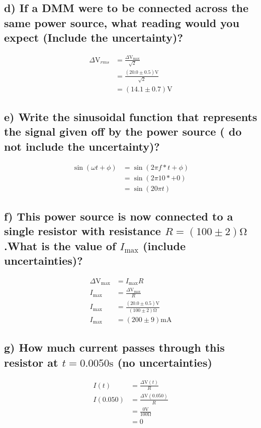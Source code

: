 \documentclass{report}
\begin{document}
\subsection*{d) If a DMM were to be connected across the same power source, what reading would you expect (Include the uncertainty)?}
    \begin{align}
    \Delta\si{\volt}_{rms}&=\frac{\Delta\si{\volt}_{\max}}{\sqrt{2}} \nonumber\\
                          &=\frac{(20.0\pm0.5)\si{\volt}}{\sqrt{2}}\nonumber\\
                          &=(14.1\pm0.7)\si{\volt}
    \end{align}

\subsection*{e) Write the sinusoidal function that represents the signal given off by the power source ( do not include the uncertainty)?}
    \begin{align}
        \sin(\omega t + \phi)&=\sin(2\pi f*t + \phi)\nonumber\\
        &=\sin(2\pi 10* + 0)\nonumber\\
        &=\sin(20\pi t)
    \end{align}

\subsection*{f) This power source is now connected to a single resistor with resistance $R = ( 100\pm2 )\si{\ohm}$.What is the value of $I_{\max}$ (include uncertainties)?}
    \begin{align}
        \Delta\si{\volt}_{\max}&=I_{\max}R\nonumber\\
        I_{\max}&=\frac{\Delta\si{\volt}_{\max}}{R}\nonumber\\
        I_{\max}&=\frac{(20.0\pm0.5)\si{\volt}}{(100\pm2)\si{\ohm}}\nonumber\\
        I_{\max}&=(200\pm9)\si{\milli\ampere}
    \end{align}

\subsection*{g) How much current passes through this resistor at $t = 0.0050\si{\second}$ (no uncertainties) }
    \begin{align}
        I(t)&=\frac{\Delta\si{\volt}(t)}{R}\nonumber\\
        I(0.050)&=\frac{\Delta\si{\volt}(0.050)}{R}\nonumber\\
        &=\frac{0\si{\volt}}{100\si{\ohm}}\nonumber\\
        &=0
    \end{align}
\end{document}
